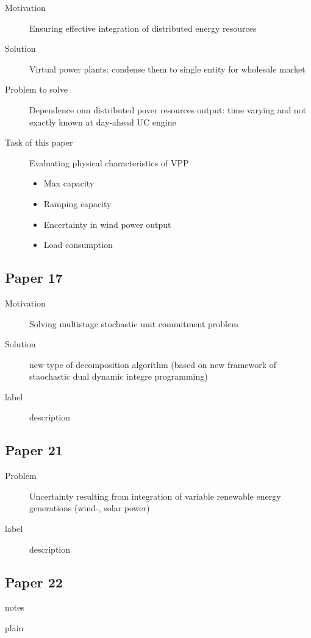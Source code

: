 \documentclass[a4paper,oneside,12pt,titlepage]{scrartcl}   %
\begin{document}
	\begin{description}
		\item[Motivation] Ensuring effective integration of distributed energy resources
		\item[Solution] Virtual power plants: condense them to single entity for wholesale market
		\item[Problem to solve] Dependence onn distributed pover resources output: time varying and not exactly known at day-ahead UC engine
		\item[Task of this paper] Evaluating physical characteristics of VPP 
		\begin{itemize}
			\item Max capacity
			\item Ramping capacity
			\item Encertainty in wind power output
			\item Load consumption
		\end{itemize}
	\end{description}
	
	
	
	\subsection{Paper 17}
	\label{subsec:paper17}
	\begin{description}
		\item[Motivation] Solving multistage stochastic unit commitment problem
		\item[Solution] new type of decomposition algorithm (based on new framework of staochastic dual dynamic integre programming)
		\item[label] description
	\end{description}
	
	\subsection{Paper 21}
	\label{subsec:paper21}
	\begin{description}
		\item[Problem] Uncertainty resulting from integration of variable renewable energy generations (wind-, solar power)
		\item[label] description
	\end{description}
	
	\subsection{Paper 22}
	\label{subsec:paper22}
	notes
	
	\newpage
	

	
	\cite{8603781}
	
	
	
	 {plain}
	
	
\end{document}
